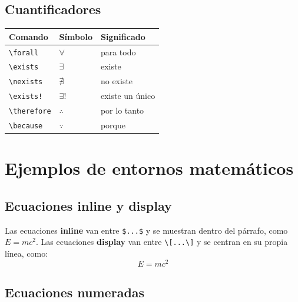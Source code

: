 \subsection{Cuantificadores}

\begin{center}
\begin{tabular}{lll}
\toprule
\textbf{Comando} & \textbf{Símbolo} & \textbf{Significado} \\
\midrule
\texttt{\textbackslash{}forall} & $\forall$ & para todo \\
\texttt{\textbackslash{}exists} & $\exists$ & existe \\
\texttt{\textbackslash{}nexists} & $\nexists$ & no existe \\
\texttt{\textbackslash{}exists!} & $\exists!$ & existe un único \\
\texttt{\textbackslash{}therefore} & $\therefore$ & por lo tanto \\
\texttt{\textbackslash{}because} & $\because$ & porque \\
\bottomrule
\end{tabular}
\end{center}


\section{Ejemplos de entornos matemáticos}

\subsection{Ecuaciones inline y display}
\label{sec:inline-display}

Las ecuaciones \textbf{inline} van entre \texttt{\$...\$} y se muestran
dentro del párrafo, como $E = m c^{2}$.
Las ecuaciones \textbf{display} van entre \texttt{\textbackslash[...\textbackslash]}
y se centran en su propia línea, como:
\[
E = m c^{2}
\]

\subsection{Ecuaciones numeradas}

